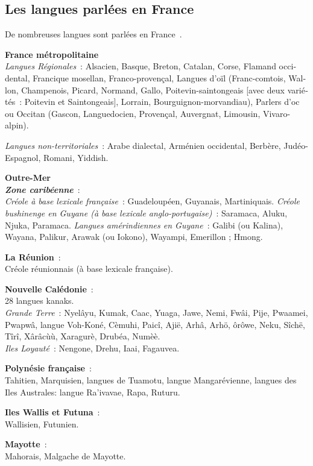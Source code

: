 \begin{french}
\begin{multicols}{2}
\subsection{Les langues parlées en France}
\label{languagesSpokenInTheFrance}
De nombreuses langues sont parlées en France~\cite{francais}.

{\bf France métropolitaine}\\
{\em Langues Régionales}~: Alsacien, Basque, Breton, Catalan, Corse, Flamand occidental, Francique mosellan, Franco-provençal, Langues d'oïl (Franc-comtois, Wallon, Champenois, Picard, Normand, Gallo, Poitevin-saintongeais [avec deux variétés~: Poitevin et Saintongeais], Lorrain, Bourguignon-morvandiau), Parlers d'oc ou Occitan (Gascon, Languedocien, Provençal, Auvergnat, Limousin, Vivaro-alpin).

{\em Langues non-territoriales}~: Arabe dialectal, Arménien occidental, Berbère, Judéo-Espagnol, Romani, Yiddish.

{\bf Outre-Mer}\\
\textbf{ \emph{Zone caribéenne}}~:\\
{\em Créole à base lexicale française}~: Guadeloupéen, Guyanais, Martiniquais.
{\em Créole bushinenge en Guyane (à base lexicale anglo-portugaise)}~: Saramaca, Aluku, Njuka, Paramaca.
{\em Langues amérindiennes en Guyane}~: Galibi (ou Kalina), Wayana, Palikur, Arawak (ou Iokono), Wayampi, Emerillon ; Hmong.

{\bf La Réunion}~:\\
Créole réunionnais (à base lexicale française).

{\bf Nouvelle Calédonie}~:\\
28 langues kanaks.\\
{\em Grande Terre}~: Nyelâyu, Kumak, Caac, Yuaga, Jawe, Nemi, Fwâi, Pije, Pwaamei, Pwapwâ, langue Voh-Koné, Cèmuhi, Paicî, Ajië, Arhâ, Arhö, ôrôwe, Neku, Sîchë, Tîrî, Xârâcùù, Xaragurè, Drubéa, Numèè. \\
{\em Iles Loyauté}~: Nengone, Drehu, Iaai, Fagauvea.

{\bf Polynésie française}~:\\
Tahitien, Marquisien, langues de Tuamotu, langue Mangarévienne, langues des Iles Australes: langue Ra'ivavae, Rapa, Ruturu.

{\bf Iles Wallis et Futuna}~:\\
Wallisien, Futunien.

{\bf Mayotte}~:\\
Mahorais, Malgache de Mayotte.


\end{multicols}
\end{french}
